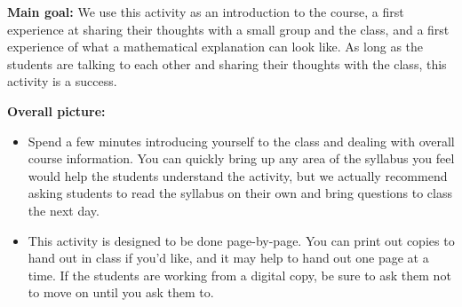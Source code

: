 \documentclass[noauthor,nooutcomes, handout]{ximera}
\begin{document}
\begin{instructorNotes}


{\bf Main goal:} We use this activity as an introduction to the course, a first experience at sharing their thoughts with a small group and the class, and a first experience of what a mathematical explanation can look like. As long as the students are talking to each other and sharing their thoughts with the class, this activity is a success.

{\bf Overall picture:} 
\begin{itemize}
	\item Spend a few minutes introducing yourself to the class and dealing with overall course information. You can quickly bring up any area of the syllabus you feel would help the students understand the activity, but we actually recommend asking students to read the syllabus on their own and bring questions to class the next day.
	\item This activity is designed to be done page-by-page. You can print out copies to hand out in class if you'd like, and it may help to hand out one page at a time. If the students are working from a digital copy, be sure to ask them not to move on until you ask them to.
\end{itemize}
	

\end{instructorNotes}
\end{document}
